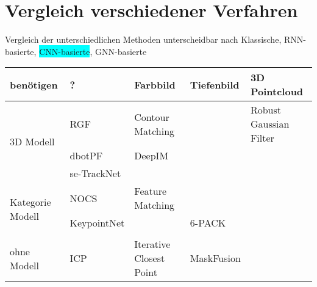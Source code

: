 \documentclass[a4paper, 11pt]{article}
\begin{document}
\section{Vergleich verschiedener Verfahren}
Vergleich der unterschiedlichen Methoden unterscheidbar nach \colorbox{Mahogany}{Klassische}, \colorbox{YellowOrange}{RNN-basierte}, \colorbox{Cyan}{CNN-basierte}, \colorbox{OliveGreen}{GNN-basierte}
\begin{table}
    \centering
    \begin{tabular}{p{1.5cm}|l|l|l|l}
        benötigen                             & ?                                     & Farbbild                                          & Tiefenbild                                        & 3D Pointcloud                               \\\hline
        \multirow{3}{1.5cm}{3D Modell}        & RGF\cite{GaussianFilter}              & Contour Matching                                  &                                                   & Robust Gaussian Filter\cite{GaussianFilter} \\
                                              & dbotPF\cite{dbotPF}                   & DeepIM\cite{Deepim}                               &                                                   &                                             \\
                                              & se-TrackNet\cite{se-TrackNet}         &                                                   &                                                   &                                             \\\hline
        \multirow{3}{1.5cm}{Kategorie Modell} & NOCS\cite{NormalizedObjectCoordiante} & Feature Matching                                  &                                                   &                                             \\
                                              & KeypointNet\cite{KeypointNet}         &                                                   & 6-PACK\cite{6pack}                                &                                             \\
                                              &                                       &                                                   &                                                   &                                             \\\hline
        \multirow{3}{1.5cm}{ohne Modell}      & ICP\cite{ICP}                         & Iterative Closest Point                           & MaskFusion\cite{MaskFusion}                       &                                             \\

\end{tabular}
\end{table}
\end{document}
